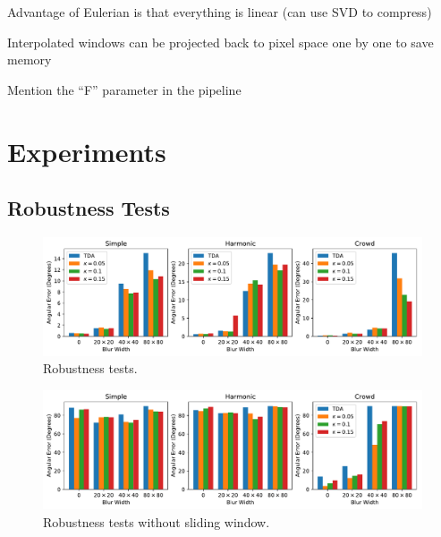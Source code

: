 \documentclass{article}
\begin{document}
Advantage of Eulerian is that everything is linear (can use SVD to compress)

Interpolated windows can be projected back to pixel space one by one to save memory

Mention the ``F'' parameter in the pipeline

\section{Experiments}

\subsection{Robustness Tests}


\begin{figure}
\centering
\includegraphics[width=\columnwidth]{RobustnessTests.pdf}
\caption{Robustness tests.}
\label{fig:RobustnessTests}
\end{figure}

\begin{figure}
\centering
\includegraphics[width=\columnwidth]{RobustnessTestsNoSW.pdf}
\caption{Robustness tests without sliding window.}
\label{fig:RobustnessTestsNoSW}
\end{figure}
\end{document}

